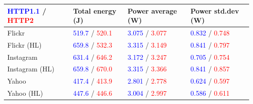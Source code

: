 \documentclass[noback]{cuposter}
\begin{document}
\begin{tabular}{|l|K{8cm}|K{8.1cm}|K{8cm}|}
    \hline
    \textcolor{blue}{HTTP1.1} / \textcolor{red}{HTTP2} & Total energy (J) & Power average (W) & Power std.dev (W) \\ \hline \hline
    Flickr & \textcolor{blue}{519.7} / \textcolor{red}{520.1}  &\textcolor{blue}{3.075} / \textcolor{red}{3.077}  & 
    \textcolor{blue}{0.832} / \textcolor{red}{0.748}  \\ \hline
    Flickr (HL) & \textcolor{blue}{659.8} / \textcolor{red}{532.3}  &\textcolor{blue}{3.315} / \textcolor{red}{3.149}  & 
    \textcolor{blue}{0.841} / \textcolor{red}{0.797}  \\ \hline \hline
    
    Instagram & \textcolor{blue}{631.4} / \textcolor{red}{646.2} & \textcolor{blue}{3.172} / \textcolor{red}{3.247} & \textcolor{blue}{0.705} / \textcolor{red}{0.754} \\ \hline
    
    Instagram (HL) & \textcolor{blue}{659.8} / \textcolor{red}{670.0} & \textcolor{blue}{3.315} / \textcolor{red}{3.366} & \textcolor{blue}{0.841} / \textcolor{red}{0.857} \\ \hline \hline
    
    Yahoo & \textcolor{blue}{417.4} / \textcolor{red}{413.9} &\textcolor{blue}{2.801} / \textcolor{red}{2.778}  & \textcolor{blue}{0.624} / \textcolor{red}{0.597}  \\ \hline 
    Yahoo (HL) & \textcolor{blue}{447.6} / \textcolor{red}{446.6} &\textcolor{blue}{3.004} / \textcolor{red}{2.997}  & \textcolor{blue}{0.586} / \textcolor{red}{0.611}  \\ \hline
\end{tabular}
\vspace{-2mm}
\end{document}
